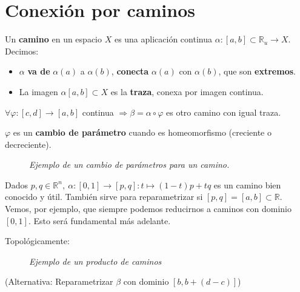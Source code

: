 \chapter{Conexión por caminos}%
\label{cha:conexion_por_caminos}
\begin{defi}
Un \textbf{camino} en un espacio $X$ es una aplicación continua $\alpha: \left[ a, b \right] \subset \mathbb{R}_u \rightarrow X$. Decimos:
\begin{itemize}
    \item $\alpha$ \textbf{va de} $\alpha\left( a \right)$ a $\alpha\left( b \right)$, \textbf{conecta} $\alpha\left( a \right)$ con $\alpha\left( b \right)$, que son \textbf{extremos}.
    \item La imagen $\alpha\left[ a, b \right] \subset X$ es la \textbf{traza}, conexa por imagen continua.
\end{itemize}
\end{defi}

\begin{prop}
$\forall \varphi: \left[ c, d \right] \rightarrow \left[ a, b \right]$ continua $\Rightarrow \beta = \alpha \circ \varphi$ es otro camino con igual traza.    

$\varphi$ es un \textbf{cambio de parámetro} cuando es homeomorfismo (creciente o decreciente).
\begin{figure}[H]
    \centering
    \caption{\textit{Ejemplo de un cambio de parámetros para un camino.}}
    \label{fig:cambio-de-caminos}
\end{figure}
\end{prop}

\begin{ej}
Dados $p, q \in \mathbb{R}^n,\ \alpha : \left[ 0, 1 \right] \rightarrow \left[ p, q \right]: t \mapsto \left( 1 - t \right) p + tq$ es un camino bien conocido y útil. También sirve para reparametrizar si $\left[ p, q \right] = \left[ a, b \right] \subset \mathbb{R}$. Vemos, por ejemplo, que siempre podemos reducirnos a caminos con dominio $\left[ 0, 1 \right]$. Esto será fundamental más adelante. 
\end{ej}

\begin{prop}
Topológicamente: 
\begin{figure}[H]
    \centering
    \caption{\textit{Ejemplo de un producto de caminos}}
    \label{fig:producto-de-caminos}
\end{figure}
(Alternativa: Reparametrizar $\beta$ con dominio $\left[ b, b + \left( d - c \right) \right]$)
\end{prop}

